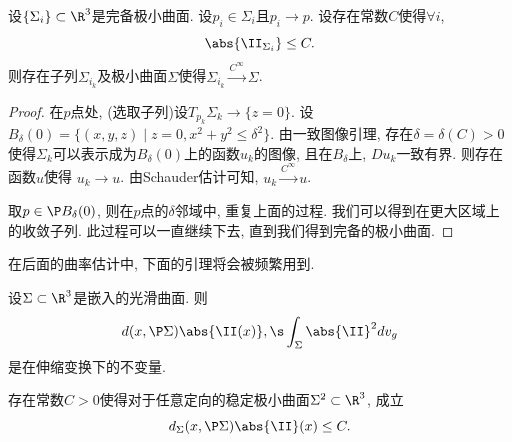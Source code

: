 \begin{theorem} \label{compactness}
    设$\{\Sigma_i \} \subset \R^3$是完备极小曲面. 设$p_i \in \Sigma_i$且$p_i \to p$.  设存在常数$C$使得$\forall i$,
    \begin{equation}
        \abs{\II_{\Sigma_i}} \le C.
    \end{equation}
    则存在子列$\Sigma_{i_k}$及极小曲面$\Sigma$使得$\Sigma_{i_k} \overset{C^\infty}{\longrightarrow} \Sigma$.
\end{theorem}
\begin{proof}
    在$p$点处, (选取子列)设$T_{p_k}\Sigma_k \to \{z=0\}$.  设$B_\delta(0)=\{(x,y,z)\mid z=0, x^2+y^2 \le \delta^2\}$. 由一致图像引理, 存在$\delta=\delta(C)>0$使得$\Sigma_k$可以表示成为$B_\delta(0)$上的函数$u_k$的图像, 且在$B_\delta$上, $Du_k$一致有界. 则存在函数$u$使得 $u_k \to u$. 由Schauder估计可知, $u_k \overset{C^\infty}{\longrightarrow} u$.  
    \par 取$p \in \P B_\delta(0)$, 则在$p$点的$\delta$邻域中,  重复上面的过程. 我们可以得到在更大区域上的收敛子列.  此过程可以一直继续下去, 直到我们得到完备的极小曲面.
\end{proof}
在后面的曲率估计中, 下面的引理将会被频繁用到.
\begin{lemma}
    设$\Sigma \subset \R^3$是嵌入的光滑曲面. 则
    \begin{equation}
        d(x,\P \Sigma)\abs{\II(x)},\s  \int_\Sigma \abs{\II}^2dv_g
    \end{equation}
    是在伸缩变换下的不变量.
\end{lemma}
\begin{theorem}
    存在常数$C>0$使得对于任意定向的稳定极小曲面$\Sigma^2 \subset \R^3$, 成立
    \begin{equation}
        d_\Sigma(x,\P \Sigma)\abs{\II}(x)  \le C.
    \end{equation}
\end{theorem}
